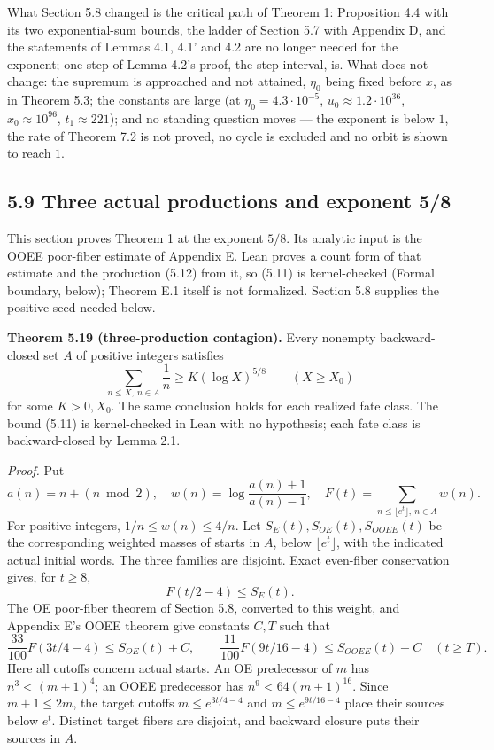 \documentclass[11pt,a4paper]{article}
\begin{document}
What Section 5.8 changed is the critical path of Theorem 1: Proposition
4.4 with its two exponential-sum bounds, the ladder of Section 5.7 with
Appendix D, and the statements of Lemmas 4.1, 4.1' and 4.2 are no longer
needed for the exponent; one step of Lemma 4.2's proof, the step
interval, is. What does not change: the supremum is approached and not
attained, \(\eta_0\) being fixed before \(x\), as in Theorem 5.3; the
constants are large (at \(\eta_0=4.3\cdot10^{-5}\),
\(u_0\approx1.2\cdot10^{36}\), \(x_0\approx10^{96}\),
\(t_1\approx221\)); and no standing question moves --- the exponent is
below \(1\), the rate of Theorem 7.2 is not proved, no cycle is excluded
and no orbit is shown to reach \(1\).

\subsection{5.9 Three actual productions and exponent
5/8}\label{three-actual-productions-and-exponent-58}

This section proves Theorem 1 at the exponent \(5/8\). Its analytic
input is the OOEE poor-fiber estimate of Appendix E. Lean proves a count
form of that estimate and the production (5.12) from it, so (5.11) is
kernel-checked (Formal boundary, below); Theorem E.1 itself is not
formalized. Section 5.8 supplies the positive seed needed below.

\textbf{Theorem 5.19 (three-production contagion).} Every nonempty
backward-closed set \(A\) of positive integers satisfies \[
\sum_{n\le X,\ n\in A}\frac1n\ge K(\log X)^{5/8}
\qquad(X\ge X_0)
\tag{5.11}
\] for some \(K>0,X_0\). The same conclusion holds for each realized
fate class. The bound (5.11) is kernel-checked in Lean with no
hypothesis; each fate class is backward-closed by Lemma 2.1.

\emph{Proof.} Put \[
a(n)=n+(n\bmod2),\quad w(n)=\log\frac{a(n)+1}{a(n)-1},\quad
F(t)=\sum_{n\le\lfloor e^t\rfloor,\ n\in A}w(n).
\] For positive integers, \(1/n\le w(n)\le4/n\). Let
\(S_E(t),S_{OE}(t),S_{OOEE}(t)\) be the corresponding weighted masses of
starts in \(A\), below \(\lfloor e^t\rfloor\), with the indicated actual
initial words. The three families are disjoint. Exact even-fiber
conservation gives, for \(t\ge8\), \[
F(t/2-4)\le S_E(t).
\] The OE poor-fiber theorem of Section 5.8, converted to this weight,
and Appendix E's OOEE theorem give constants \(C,T\) such that \[
\frac{33}{100}F(3t/4-4)\le S_{OE}(t)+C,\qquad
\frac{11}{100}F(9t/16-4)\le S_{OOEE}(t)+C
\quad(t\ge T).
\tag{5.12}
\] Here all cutoffs concern actual starts. An OE predecessor of \(m\)
has \(n^3<(m+1)^4\); an OOEE predecessor has \(n^9<64(m+1)^{16}\). Since
\(m+1\le2m\), the target cutoffs \(m\le e^{3t/4-4}\) and
\(m\le e^{9t/16-4}\) place their sources below \(e^t\). Distinct target
fibers are disjoint, and backward closure puts their sources in \(A\).
\end{document}
